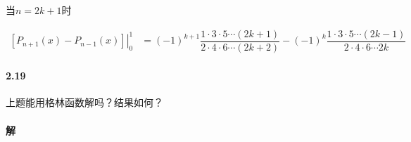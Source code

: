 \documentclass{article}
\begin{document}
当$n=2k+1$时

\begin{equation*}
  \begin{aligned}
    \left. \left[  P_{n+1} \left( x \right) - P_{n-1} \left( x \right) \right] \right|_0^1
    &= \left( -1 \right)^{k+1} \dfrac{1 \cdot 3 \cdot 5 \cdots \left( 2k+1 \right)}{2 \cdot 4 \cdot 6 \cdots (2k+2)}
    - \left( -1 \right)^{k} \dfrac{1 \cdot 3 \cdot 5 \cdots \left( 2k-1 \right)}{2 \cdot 4 \cdot 6 \cdots 2k}
  \end{aligned}
\end{equation*}




\paragraph{2.19}

上题能用格林函数解吗？结果如何？

\paragraph{解}
\end{document}
